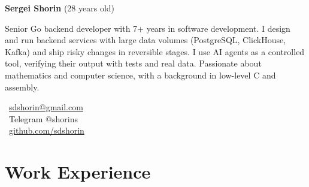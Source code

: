 \documentclass{dodiresume}
\begin{document}
\begin{minipage}{0.7\textwidth}
\begin{flushleft}
\LARGE \textbf{\textcolor{namecolor}{Sergei Shorin}} \normalsize{(28 years old)}

\vspace{0.3cm}
Senior Go backend developer with 7+ years in software development. I design and run backend services with large data volumes (PostgreSQL, ClickHouse, Kafka) and ship risky changes in reversible stages. I use AI agents as a controlled tool, verifying their output with tests and real data. Passionate about mathematics and computer science, with a background in low-level C and assembly.
\end{flushleft}
\end{minipage}
\begin{minipage}{0.28\textwidth}
\begin{flushright}
\faEnvelope\ \href{mailto:sdshorin@gmail.com}{sdshorin@gmail.com} \\
\faPaperPlane\ Telegram @shorins \\
\faGithub\ \href{https://github.com/sdshorin}{github.com/sdshorin}
\end{flushright}
\end{minipage}

\vspace{0.1cm}

\section{Work Experience}

\end{document}
